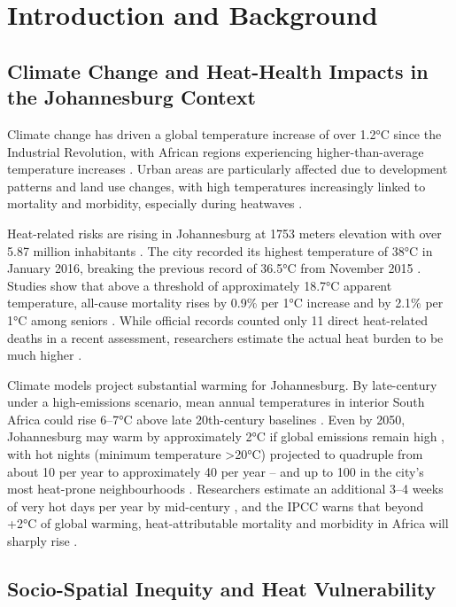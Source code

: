 \section{Introduction and Background}

\subsection{Climate Change and Heat-Health Impacts in the Johannesburg Context}

Climate change has driven a global temperature increase of over 1.2°C since the Industrial Revolution, with African regions experiencing higher-than-average temperature increases \citep{IPCC2022}. Urban areas are particularly affected due to development patterns and land use changes, with high temperatures increasingly linked to mortality and morbidity, especially during heatwaves \citep{Gasparrini2015, Analitis2018}.

Heat-related risks are rising in Johannesburg at 1753 meters elevation with over 5.87 million inhabitants \citep{Worldometer2023}. The city recorded its highest temperature of 38°C in January 2016, breaking the previous record of 36.5°C from November 2015 \citep{Strydom2016}. Studies show that above a threshold of approximately 18.7°C apparent temperature, all-cause mortality rises by 0.9\% per 1°C increase and by 2.1\% per 1°C among seniors \citep{Wichmann2017, Scovronick2018}. While official records counted only 11 direct heat-related deaths in a recent assessment, researchers estimate the actual heat burden to be much higher \citep{Chersich2023}.

Climate models project substantial warming for Johannesburg. By late-century under a high-emissions scenario, mean annual temperatures in interior South Africa could rise 6--7°C above late 20th-century baselines \citep{Engelbrecht2015}. Even by 2050, Johannesburg may warm by approximately 2°C if global emissions remain high \citep{Engelbrecht2015, Souverijns2022}, with hot nights (minimum temperature >20°C) projected to quadruple from about 10 per year to approximately 40 per year -- and up to 100 in the city's most heat-prone neighbourhoods \citep{WorldBank2024}. Researchers estimate an additional 3--4 weeks of very hot days per year by mid-century \citep{Garland2015}, and the IPCC warns that beyond +2°C of global warming, heat-attributable mortality and morbidity in Africa will sharply rise \citep{IPCC2022}.

\subsection{Socio-Spatial Inequity and Heat Vulnerability}

